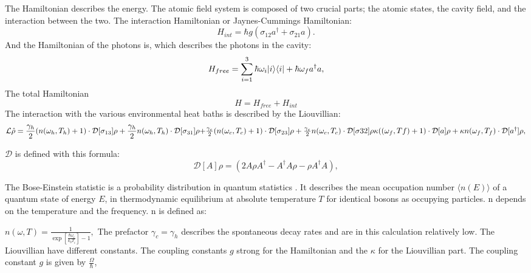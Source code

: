 \documentclass[12pt,a4paper]{article}
\DeclarePairedDelimiter\bra{\langle}{\rvert}
\DeclarePairedDelimiter\ket{\lvert}{\rangle}
\begin{document}
The Hamiltonian describes the energy. 
The atomic field system is composed of two crucial 
parts; the atomic states, the cavity field, and the interaction between the two.
The interaction Hamiltonian or Jaynes-Cummings Hamiltonian:
\begin{equation}
H_{int}=\hbar g(\sigma_{12}a^{\dag}+\sigma_{21}a).
\end{equation}
And the Hamiltonian of the photons is, which describes the photons in the cavity:
\begin{equation}
H_{free}=\sum_{i=1}^3 \hbar \omega_i \ket{i}\bra{i}+\hbar \omega_f a^{\dag}a,
\end{equation}
The total Hamiltonian
\begin{equation}
H=H_{free}+H_{int}
\end{equation}
\newpage
The interaction with the various environmental heat baths is described by the Liouvillian:
\begin{equation}
\mathcal{L}\hat{\rho}=\frac{\gamma_h}{2}(n(\omega_h,T_h)+1)   \cdot \mathcal{D}[\sigma_{13}]\rho
+\frac{\gamma_h}{2}n(\omega_h,T_h)\cdot \mathcal{D}[\sigma_{31}]\rho $$\\$$
+\frac{\gamma_c}{2}(n(\omega_c,T_c)+1)\cdot \mathcal{D}[\sigma_{23}]\rho
+\frac{\gamma_c}{2}n(\omega_c,T_c) \cdot	 \mathcal{D}[\sigma{32}]\rho$$\\$$
\kappa((\omega_f,Tf)+1)	\cdot\mathcal{D}[a]\rho+
\kappa n(\omega_f,T_f)\cdot \mathcal{D}[a^{\dag}]\rho,
\end{equation}

$\mathcal{D}$ is defined with this formula:
\begin{equation}
\mathcal{D}[A]\rho=(2A \rho	A^{\dag}-A^{\dag}A\rho-\rho A^{\dag}A),
\end{equation}

The Bose-Einstein statistic is a probability distribution in quantum statistics . It describes the mean occupation number $\langle n(E) \rangle$ of a quantum state of energy $E$, in thermodynamic equilibrium at absolute temperature $T $ for identical bosons as occupying particles. n depends on the temperature and the frequency.
n is defined as:

$
n(\omega,T)=\frac{1}{\exp[\frac{\hbar \omega_i}{k_b T_i}]-1},
$
The  prefactor $\gamma_c=\gamma_h$ describes the spontaneous decay rates and are in this calculation relatively low.
The Liouvillian have different constants. The coupling constants $g$ strong for the Hamiltonian and the $\kappa$ for the Liouvillian part. 
The coupling constant $g$ is given by $\frac{\Omega}{\hbar}$,
\end{document}
